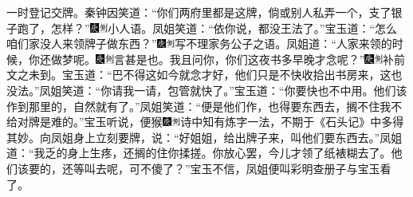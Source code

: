 一时登记交牌。秦钟因笑道：``你们两府里都是这牌，倘或别人私弄一个，支了银子跑了，怎样？''{\includegraphics[width=3mm]{../Images/00004}\includegraphics[width=3mm]{../Images/00011}\footnotesize \kaishu 小人语。}凤姐笑道：``依你说，都没王法了。''宝玉道：``怎么咱们家没人来领牌子做东西？''{\includegraphics[width=3mm]{../Images/00004}\includegraphics[width=3mm]{../Images/00011}\footnotesize \kaishu 写不理家务公子之语。}凤姐道：``人家来领的时候，你还做梦呢。{\includegraphics[width=3mm]{../Images/00004}\includegraphics[width=3mm]{../Images/00011}\footnotesize \kaishu 言甚是也。}我且问你，你们这夜书多早晚才念呢？''{\includegraphics[width=3mm]{../Images/00004}\includegraphics[width=3mm]{../Images/00011}\footnotesize \kaishu 补前文之未到。}宝玉道：``巴不得这如今就念才好，他们只是不快收拾出书房来，这也没法。''凤姐笑道：``你请我一请，包管就快了。''宝玉道：``你要快也不中用。他们该作到那里的，自然就有了。''凤姐笑道：``便是他们作，也得要东西去，搁不住我不给对牌是难的。''宝玉听说，便猴{\includegraphics[width=3mm]{../Images/00004}\includegraphics[width=3mm]{../Images/00011}\footnotesize \kaishu 诗中知有炼字一法，不期于《石头记》中多得其妙。}向凤姐身上立刻要牌，说：``好姐姐，给出牌子来，叫他们要东西去。''凤姐道：``我乏的身上生疼，还搁的住你揉搓。你放心罢，今儿才领了纸裱糊去了。他们该要的，还等叫去呢，可不傻了？''宝玉不信，凤姐便叫彩明查册子与宝玉看了。

